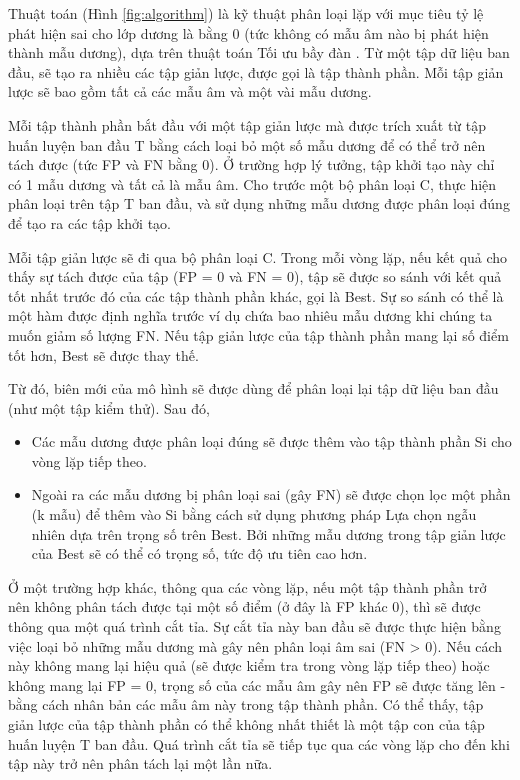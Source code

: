 \documentclass[./../main.tex]{subfiles}
\begin{document}
Thuật toán (Hình \ref{fig:algorithm}) là kỹ thuật phân loại lặp với mục tiêu tỷ lệ phát hiện sai cho lớp dương là bằng 0 (tức không có mẫu âm nào bị phát hiện thành mẫu dương), dựa trên thuật toán Tối ưu bầy đàn \cite{swarm}. Từ một tập dữ liệu ban đầu, sẽ tạo ra nhiều các tập giản lược, được gọi là tập thành phần. Mỗi tập giản lược sẽ bao gồm tất cả các mẫu âm và một vài mẫu dương.

Mỗi tập thành phần bắt đầu với một tập giản lược mà được trích xuất từ tập huấn luyện ban đầu T bằng cách loại bỏ một số mẫu dương để có thể trở nên tách được (tức FP và FN bằng 0). Ở trường hợp lý tưởng, tập khởi tạo này chỉ có 1 mẫu dương và tất cả là mẫu âm. Cho trước một bộ phân loại C, thực hiện phân loại trên tập T ban đầu, và sử dụng những mẫu dương được phân loại đúng để tạo ra các tập khởi tạo.

Mỗi tập giản lược sẽ đi qua bộ phân loại C. Trong mỗi vòng lặp, nếu kết quả cho thấy sự tách được của tập (FP = 0 và FN = 0), tập sẽ được so sánh với kết quả tốt nhất trước đó của các tập thành phần khác, gọi là Best. Sự so sánh có thể là một hàm được định nghĩa trước ví dụ chứa bao nhiêu mẫu dương khi chúng ta muốn giảm số lượng FN. Nếu tập giản lược của tập thành phần mang lại số điểm tốt hơn, Best sẽ được thay thế.

Từ đó, biên mới của mô hình sẽ được dùng để phân loại lại tập dữ liệu ban đầu (như một tập kiểm thử). Sau đó,
\begin{itemize}
	\item Các mẫu dương được phân loại đúng sẽ được thêm vào tập thành phần Si cho vòng lặp tiếp theo.
	\item Ngoài ra các mẫu dương bị phân loại sai (gây FN) sẽ được chọn lọc một phần (k mẫu) để thêm vào Si bằng cách sử dụng phương pháp Lựa chọn ngẫu nhiên dựa trên trọng số trên Best. Bởi những mẫu dương trong tập giản lược của Best sẽ có thể có trọng số, tức độ ưu tiên cao hơn.
\end{itemize}

Ở một trường hợp khác, thông qua các vòng lặp, nếu một tập thành phần trở nên không phân tách được tại một số điểm (ở đây là FP khác 0), thì sẽ được thông qua một quá trình cắt tỉa. Sự cắt tỉa này ban đầu sẽ được thực hiện bằng việc loại bỏ những mẫu dương mà gây nên phân loại âm sai (FN > 0). Nếu cách này không mang lại hiệu quả (sẽ được kiểm tra trong vòng lặp tiếp theo) hoặc không mang lại FP = 0, trọng số của các mẫu âm gây nên FP sẽ được tăng lên - bằng cách nhân bản các mẫu âm này trong tập thành phần. Có thể thấy, tập giản lược của tập thành phần có thể không nhất thiết là một tập con của tập huấn luyện T ban đầu. Quá trình cắt tỉa sẽ tiếp tục qua các vòng lặp cho đến khi tập này trở nên phân tách lại một lần nữa.
\end{document}
